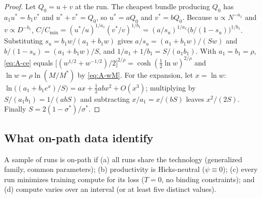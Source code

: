 \begin{proof}
Let $Q_0=u+v$ at the run. The cheapest bundle producing $Q_0$ has $a_1u^*=b_1v^*$ and $u^*+v^*=Q_0$, so $u^*=aQ_0$ and
$v^*=bQ_0$. Because $u\propto N^{-a_1}$ and $v\propto D^{-b_1}$, $C/C_{\min}=(u^*/u)^{1/a_1}(v^*/v)^{1/b_1}
=(a/s_u)^{1/a_1}\big(b/(1-s_u)\big)^{1/b_1}$. Substituting $s_u=b_1w/(a_1+b_1w)$ gives
$a/s_u=(a_1+b_1w)/(Sw)$ and $b/(1-s_u)=(a_1+b_1w)/S$, and $1/a_1+1/b_1=S/(a_1b_1)$. With $a_1=b_1=\rho$,
\eqref{eq:A-ce} equals $\big[(w^{1/2}+w^{-1/2})/2\big]^{2/\rho}=\cosh(\tfrac12\ln w)^{2/\rho}$ and $\ln w=\rho\ln(M/M^*)$ by
\eqref{eq:A-wM}. For the expansion, let $x=\ln w$: $\ln\big((a_1+b_1e^x)/S\big)=ax+\tfrac12abx^2+O(x^3)$; multiplying by
$S/(a_1b_1)=1/(abS)$ and subtracting $x/a_1=x/(bS)$ leaves $x^2/(2S)$. Finally $S=2(1-\sigma^*)/\sigma^*$.
\end{proof}

\subsection{What on-path data identify}\label{app:onpath}

\begin{definition}\label{def:onpath}
A sample of runs is on-path if (a) all runs share the technology (generalized family, common parameters); (b)
productivity is Hicks-neutral ($\psi\equiv0$); (c) every run minimizes training compute for its loss ($T=0$, no binding
constraints); and (d) compute varies over an interval (or at least five distinct values).
\end{definition}

